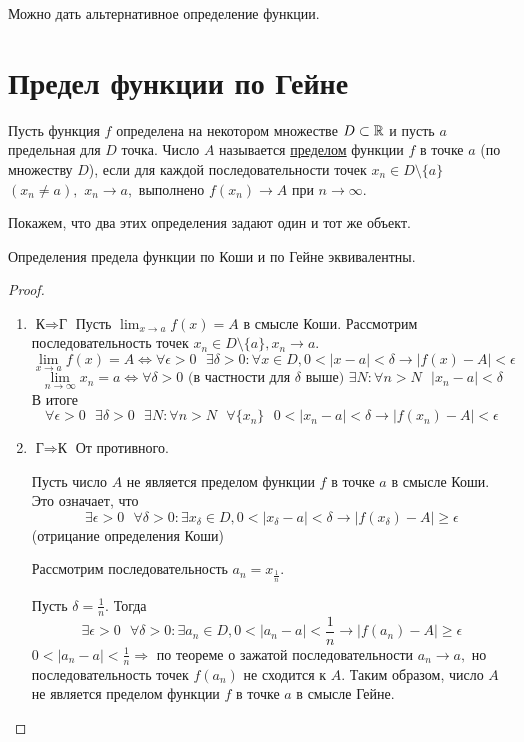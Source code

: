 	Можно дать альтернативное определение функции.
	
	\section{Предел функции по Гейне}
	
	\begin{theorem}
		Пусть функция $f$ определена на некотором множестве $D \subset \mathbb R$ и пусть $a$ предельная для $D$ точка. Число $A$ называется \underline{пределом} функции $f$ в точке $a$ (по множеству $D$), если для каждой последовательности точек $x_n \in D \setminus \{a\}$ $(x_n \neq a),$ $x_n \to a,$ выполнено $f(x_n) \to A$ при $n \to \infty.$
	\end{theorem}
	
	Покажем, что два этих определения задают один и тот же объект.
	
	\begin{theorem}
		Определения предела функции по Коши и по Гейне эквивалентны.
	\end{theorem}
	
	\begin{proof}
		\begin{enumerate}
			\item $\text{К} \Rightarrow \text{Г}$
			Пусть $\lim_{x \to a} f(x) = A$ в смысле Коши. Рассмотрим последовательность точек $x_n \in D \setminus \{a\}, x_n \to a.$
			\[ \lim_{x \to a} f(x) = A \Leftrightarrow \forall \epsilon > 0 \text{ } \exists \delta > 0: \forall x \in D, 0 < |x - a| < \delta \rightarrow |f(x) - A| < \epsilon \]
			\[ \lim_{n \to \infty} x_n = a \Leftrightarrow \forall \delta > 0 \text{ (в частности для } \delta \text{ выше) } \exists N: \forall n > N \text{ } |x_n - a| < \delta \]
			В итоге
			\[ \forall \epsilon > 0 \text{ } \exists \delta > 0 \text{ } \exists N: \forall n > N \text{ } \forall \{x_n\} \text{  } 0 < |x_n - a| < \delta \rightarrow |f(x_n) - A| < \epsilon \]
			
			\item $\text{Г} \Rightarrow \text{К}$ От противного.
			
			Пусть число $A$ не является пределом функции $f$ в точке $a$ в смысле Коши. Это означает, что
			\[ \exists \epsilon > 0 \text{ } \forall \delta > 0: \exists x_{\delta} \in D, 0 < |x_{\delta} - a| < \delta \rightarrow |f(x_{\delta}) - A| \geqslant \epsilon \]
			(отрицание определения Коши)
			
			Рассмотрим последовательность $a_n = x_{\frac{1}{n}}$.
			
			Пусть $\delta = \frac{1}{n}.$ Тогда
			\[ \exists \epsilon > 0 \text{ } \forall \delta > 0: \exists a_n \in D, 0 < |a_n - a| < \frac{1}{n} \rightarrow |f(a_n) - A| \geqslant \epsilon \]
			$0 < |a_n - a| < \frac{1}{n} \Rightarrow$ по теореме о зажатой последовательности $a_n \to a,$ но последовательность точек $f(a_n)$ не сходится к $A$. Таким образом, число $A$ не является пределом функции $f$ в точке $a$ в смысле Гейне.
		\end{enumerate}
	\end{proof}
	
